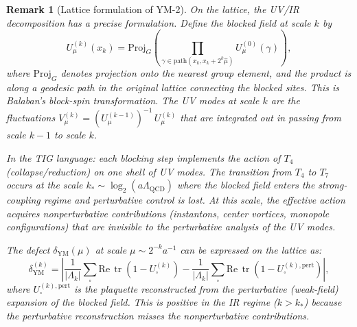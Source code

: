 \documentclass[11pt]{article}
\newtheorem{remark}[theorem]{Remark}
\DeclareMathOperator{\tr}{tr}
\begin{document}
\begin{remark}[Lattice formulation of YM-2]
\label{rem:ym2-lattice}
On the lattice, the UV/IR decomposition has a precise formulation.
Define the \emph{blocked field} at scale $k$ by
\begin{equation}\label{eq:block-field}
  U_\mu^{(k)}(x_k) = \mathrm{Proj}_G\!\left(
  \prod_{\gamma \in \mathrm{path}(x_k, x_k + 2^k\hat\mu)}
  U_\mu^{(0)}(\gamma)\right),
\end{equation}
where $\mathrm{Proj}_G$ denotes projection onto the nearest group
element, and the product is along a geodesic path in the original lattice
connecting the blocked sites.  This is Balaban's block-spin transformation.
The UV modes at scale $k$ are the fluctuations
$V_\mu^{(k)} = (U_\mu^{(k-1)})^{-1}\,U_\mu^{(k)}$ that are integrated
out in passing from scale $k-1$ to scale $k$.

In the TIG language: each blocking step implements the action of $T_4$
(collapse/reduction) on one shell of UV modes.  The transition from $T_4$
to $T_7$ occurs at the scale $k_* \sim \log_2(a\Lambda_{\mathrm{QCD}})$
where the blocked field enters the strong-coupling regime and
perturbative control is lost.  At this scale, the effective action acquires
nonperturbative contributions (instantons, center vortices, monopole
configurations) that are invisible to the perturbative analysis of the UV
modes.

The defect $\delta_{\mathrm{YM}}(\mu)$ at scale $\mu \sim 2^{-k} a^{-1}$
can be expressed on the lattice as:
\begin{equation}\label{eq:lattice-defect}
  \delta_{\mathrm{YM}}^{(k)}
  = \left|\frac{1}{|\Lambda_k|}\sum_\square
  \mathrm{Re}\,\tr(1 - U_\square^{(k)})
  - \frac{1}{|\Lambda_k|}\sum_\square
  \mathrm{Re}\,\tr(1 - U_\square^{(k),\mathrm{pert}})\right|,
\end{equation}
where $U_\square^{(k),\mathrm{pert}}$ is the plaquette reconstructed
from the perturbative (weak-field) expansion of the blocked field.
This is positive in the IR regime ($k > k_*$) because the perturbative
reconstruction misses the nonperturbative contributions.
\end{remark}
\end{document}
